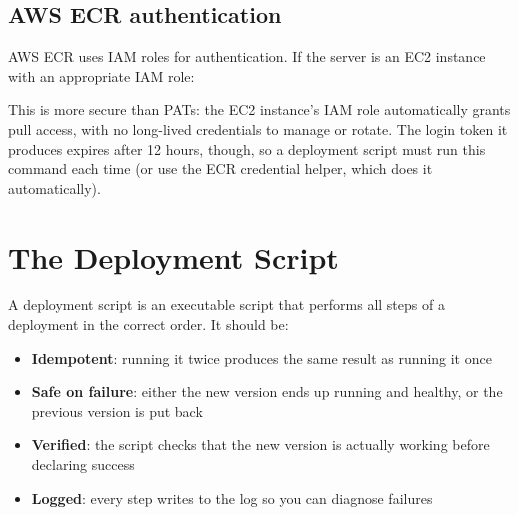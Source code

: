 \subsection*{AWS ECR authentication}\label{23-code-transfer:aws-ecr-authentication}

AWS ECR uses IAM roles for authentication. If the server is an EC2 instance with an appropriate IAM role:

\begin{codebox}[short]

\begin{Shaded}
\begin{Highlighting}[]
\KeywordTok{|} \DataTypeTok{\textbackslash{}}
     \DataTypeTok{\textbackslash{}}
\end{Highlighting}
\end{Shaded}

\end{codebox}

\noindent{}This is more secure than PATs: the EC2 instance's IAM role automatically grants pull access, with no long-lived credentials to manage or rotate. The login token it produces expires after 12 hours, though, so a deployment script must run this command each time (or use the ECR credential helper, which does it automatically).

\setcounter{section}{3}
\section{The Deployment Script}\label{23-code-transfer:234-the-deployment-script}

A deployment script is an executable script that performs all steps of a deployment in the correct order. It should be:

\begin{itemize}
\tightlist
\item
  \textbf{Idempotent}: running it twice produces the same result as running it once
\item
  \textbf{Safe on failure}: either the new version ends up running and healthy, or the previous version is put back
\item
  \textbf{Verified}: the script checks that the new version is actually working before declaring success
\item
  \textbf{Logged}: every step writes to the log so you can diagnose failures
\end{itemize}

